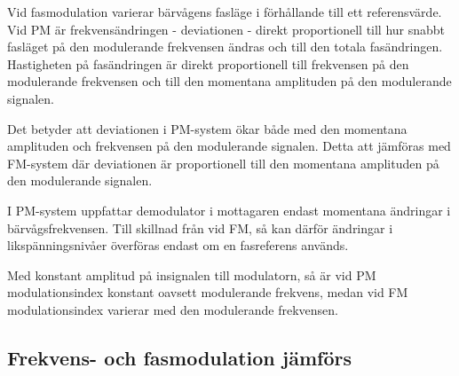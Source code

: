 Vid fasmodulation varierar bärvågens fasläge i förhållande till ett
referensvärde. Vid PM är frekvensändringen - deviationen - direkt proportionell
till hur snabbt fasläget på den modulerande frekvensen ändras och till den
totala fasändringen. Hastigheten på fasändringen är direkt proportionell till
frekvensen på den modulerande frekvensen och till den momentana amplituden på
den modulerande signalen.

Det betyder att deviationen i PM-system ökar både med den momentana amplituden
och frekvensen på den modulerande signalen. Detta att jämföras med FM-system där
deviationen är proportionell till den momentana amplituden på den modulerande
signalen.

I PM-system uppfattar demodulator i mottagaren endast momentana ändringar i
bärvågsfrekvensen. Till skillnad från vid FM, så kan därför ändringar i
likspänningsnivåer överföras endast om en fasreferens används.

Med konstant amplitud på insignalen till modulatorn, så är vid PM
modulationsindex konstant oavsett modulerande frekvens, medan vid FM
modulationsindex varierar med den modulerande frekvensen.

\subsection{Frekvens- och fasmodulation jämförs}


